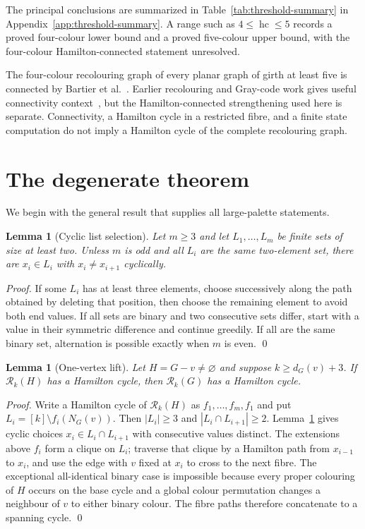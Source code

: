 \documentclass[11pt]{article}
\newtheorem{lemma}[theorem]{Lemma}
\theoremstyle{remark}
\newcommand{\Rk}{\mathcal R_k}
\newcommand{\hc}{\operatorname{hc}}
\numberwithin{equation}{section}
\numberwithin{table}{section}
\begin{document}
The principal conclusions are summarized in Table~\ref{tab:threshold-summary}
in Appendix~\ref{app:threshold-summary}.  A range such as $4\le\hc\le5$ records a proved four-colour lower bound and a proved five-colour upper bound, with the four-colour Hamilton-connected statement unresolved.



The four-colour recolouring graph of every planar graph of girth at least five is connected by Bartier et al.~\cite{BBFHMP23}.  Earlier recolouring and Gray-code work gives useful connectivity context~\cite{DFFV06,ChMa11}, but the Hamilton-connected strengthening used here is separate.  Connectivity, a Hamilton cycle in a restricted fibre, and a finite state computation do not imply a Hamilton cycle of the complete recolouring graph.

\section{The degenerate theorem}
\label{sec:degenerate}

We begin with the general result that supplies all large-palette statements.

\begin{lemma}[Cyclic list selection]
\label{lem:list-cycle}
Let $m\ge3$ and let $L_1,\ldots,L_m$ be finite sets of size at least two.  Unless $m$ is odd and all $L_i$ are the same two-element set, there are $x_i\in L_i$ with $x_i\ne x_{i+1}$ cyclically.
\end{lemma}

\begin{proof}
If some $L_i$ has at least three elements, choose successively along the path obtained by deleting that position, then choose the remaining element to avoid both end values.  If all sets are binary and two consecutive sets differ, start with a value in their symmetric difference and continue greedily.  If all are the same binary set, alternation is possible exactly when $m$ is even. \qed
\end{proof}

\begin{lemma}[One-vertex lift]
\label{lem:single-lift}
Let $H=G-v\ne\varnothing$ and suppose $k\ge d_G(v)+3$.  If $\Rk(H)$ has a Hamilton cycle, then $\Rk(G)$ has a Hamilton cycle.
\end{lemma}

\begin{proof}
Write a Hamilton cycle of $\Rk(H)$ as $f_1,\ldots,f_m,f_1$ and put $L_i=[k]\setminus f_i(N_G(v))$.  Then $|L_i|\ge3$ and $|L_i\cap L_{i+1}|\ge2$.  Lemma~\ref{lem:list-cycle} gives cyclic choices $x_i\in L_i\cap L_{i+1}$ with consecutive values distinct.  The extensions above $f_i$ form a clique on $L_i$; traverse that clique by a Hamilton path from $x_{i-1}$ to $x_i$, and use the edge with $v$ fixed at $x_i$ to cross to the next fibre.  The exceptional all-identical binary case is impossible because every proper colouring of $H$ occurs on the base cycle and a global colour permutation changes a neighbour of $v$ to either binary colour.  The fibre paths therefore concatenate to a spanning cycle. \qed
\end{proof}
\end{document}
